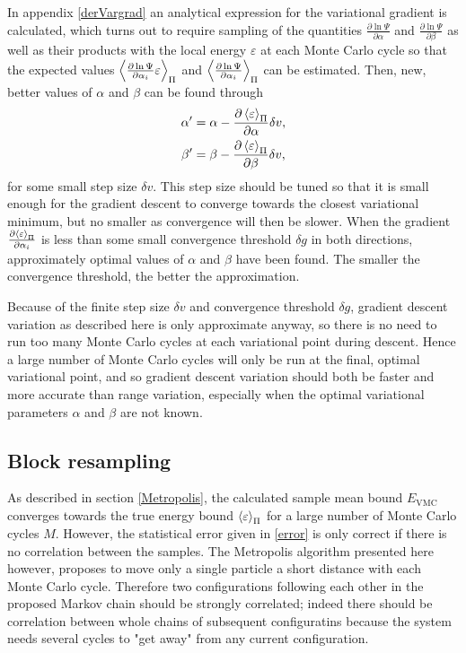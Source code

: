 \documentclass[a4paper,8pt]{article}
\begin{document}
\begin{multicols}{2}
In appendix \ref{derVargrad} an analytical expression for the variational gradient is calculated, which turns out to require sampling of the quantities $\frac{\partial\ln\Psi}{\partial\alpha}$ and $\frac{\partial\ln\Psi}{\partial\beta}$ as well as their products with the local energy $\varepsilon$ at each Monte Carlo cycle so that the expected values $\ev{\frac{\partial\ln\Psi}{\partial\alpha_i}\varepsilon}_\Pi$ and $\ev{\frac{\partial\ln\Psi}{\partial\alpha_i}}_\Pi$ can be estimated. Then, new, better values of $\alpha$ and $\beta$ can be found through
\begin{align}
\alpha' &= \alpha-\frac{\partial\ev{\varepsilon}_\Pi}{\partial\alpha}\delta v, \\
\beta' &= \beta-\frac{\partial\ev{\varepsilon}_\Pi}{\partial\beta}\delta v,
\end{align}
for some small step size $\delta v$. This step size should be tuned so that it is small enough for the gradient descent to converge towards the closest variational minimum, but no smaller as convergence will then be slower. When the gradient $\frac{\partial\ev{\varepsilon}_\Pi}{\partial\alpha_i}$ is less than some small convergence threshold $\delta g$ in both directions, approximately optimal values of $\alpha$ and $\beta$ have been found. The smaller the convergence threshold, the better the approximation.

Because of the finite step size $\delta v$ and convergence threshold $\delta g$, gradient descent variation as described here is only approximate anyway, so there is no need to run too many Monte Carlo cycles at each variational point during descent. Hence a large number of Monte Carlo cycles will only be run at the final, optimal variational point, and so gradient descent variation should both be faster and more accurate than range variation, especially when the optimal variational parameters $\alpha$ and $\beta$ are not known.


\subsection{Block resampling}
As described in section \ref{Metropolis}, the calculated sample mean bound $E_\text{VMC}$ converges towards the true energy bound $\ev{\varepsilon}_\Pi$ for a large number of Monte Carlo cycles $M$. However, the statistical error given in \eqref{error} is only correct if there is no correlation between the samples. The Metropolis algorithm presented here however, proposes to move only a single particle a short distance with each Monte Carlo cycle. Therefore two configurations following each other in the proposed Markov chain should be strongly correlated; indeed there should be correlation between whole chains of subsequent configuratins because the system needs several cycles to "get away" from any current configuration.


\end{multicols}
\end{document}
